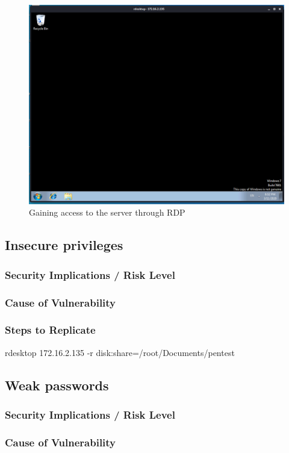 \documentclass{report}
\begin{document}
\begin{figure}[!htb]
	\centering
	\includegraphics[scale=0.4]{img/rdp2.png}
	\caption{Gaining access to the server through RDP}
\end{figure}
\pagebreak

\subsection{Insecure privileges}
\subsubsection{Security Implications / Risk Level}
\subsubsection{Cause of Vulnerability}
\subsubsection{Steps to Replicate}
rdesktop 172.16.2.135 -r disk:share=/root/Documents/pentest
\subsection{Weak passwords}
\subsubsection{Security Implications / Risk Level}
\subsubsection{Cause of Vulnerability}
\end{document}
